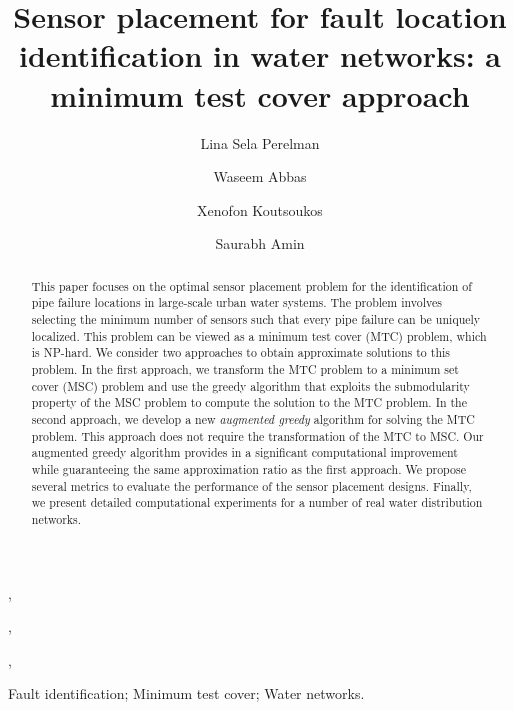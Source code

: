 \documentclass[twocolumn]{autart}
\begin{document}
\begin{frontmatter}


\title{Sensor placement for fault location identification in water networks: a minimum test cover approach} 
\author[MIT]{Lina Sela Perelman},    \author[Vanderbilt]{Waseem Abbas},
\author[Vanderbilt]{Xenofon Koutsoukos},               \author[MIT]{Saurabh Amin}  

\address[MIT]{Massachusetts Institute of Technology}  \address[Vanderbilt]{Vanderbilt University}             \vspace{-0.35cm}
\begin{keyword}                           Fault identification; Minimum test cover; Water networks.               \end{keyword}                             

\begin{abstract}                          This paper focuses on the optimal sensor placement problem for the identification of pipe failure locations in large-scale urban water systems. The problem involves selecting the minimum number of sensors such that every pipe failure can be uniquely localized. This problem can be viewed as a minimum test cover (MTC) problem, which is NP-hard.  We consider two approaches to obtain approximate solutions to this problem. In the first approach, we transform the MTC problem to a minimum set cover (MSC) problem and use the greedy algorithm that exploits the submodularity property of the MSC problem to compute the solution to the MTC problem. 
In the second approach, we develop a new \textit{augmented greedy} algorithm for solving the MTC problem. This approach does not require the transformation of the MTC to MSC. Our augmented greedy algorithm provides in a significant computational improvement while guaranteeing the same approximation ratio as the first approach. We propose several metrics to evaluate the performance of the sensor placement designs. Finally, we present detailed computational experiments for a number of real water distribution networks.\vspace{-0.35cm}
\end{abstract}
\end{frontmatter}
\end{document}
